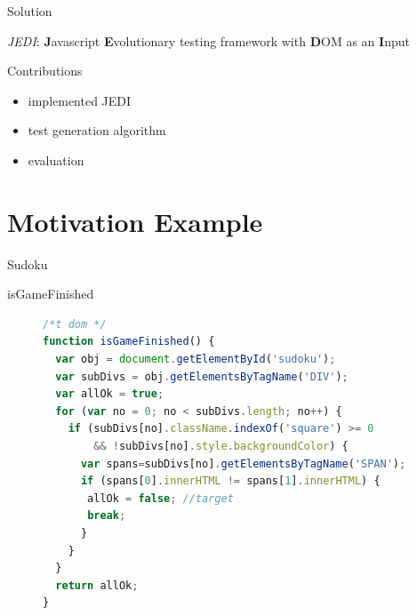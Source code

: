 \documentclass{beamer}
\begin{document}
\begin{frame}{Solution}

  \emph{JEDI}: \textbf{J}avascript \textbf{E}volutionary testing framework with \textbf{D}OM as an \textbf{I}nput

  \begin{block}{Contributions}
    \begin{itemize}
  \item implemented JEDI
  \item test generation algorithm
  \item  evaluation
    \end{itemize}
  \end{block}
\end{frame}

\section{Motivation Example}

\begin{frame}{Sudoku}
\end{frame}  

\begin{frame}[fragile]{isGameFinished}

\begin{figure}
  \centering
  \begin{lstlisting}[style=htmlcssjs,language=JavaScript,basicstyle={\tiny\ttfamily}]
/*t dom */
function isGameFinished() {
  var obj = document.getElementById('sudoku'); 
  var subDivs = obj.getElementsByTagName('DIV'); 
  var allOk = true;
  for (var no = 0; no < subDivs.length; no++) { 
    if (subDivs[no].className.indexOf('square') >= 0 
        && !subDivs[no].style.backgroundColor) {
      var spans=subDivs[no].getElementsByTagName('SPAN');
      if (spans[0].innerHTML != spans[1].innerHTML) { 
       allOk = false; //target 
       break;
      }
    }
  } 
  return allOk;
}
  \end{lstlisting}
\end{figure}

\end{frame}
\end{document}

